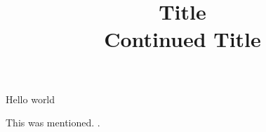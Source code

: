 

\title{%
  Title \\
  Continued Title}



\maketitle
\thispagestyle{fancy}

Hello world

This was mentioned. \citep{Joyner17}.






\clearpage



